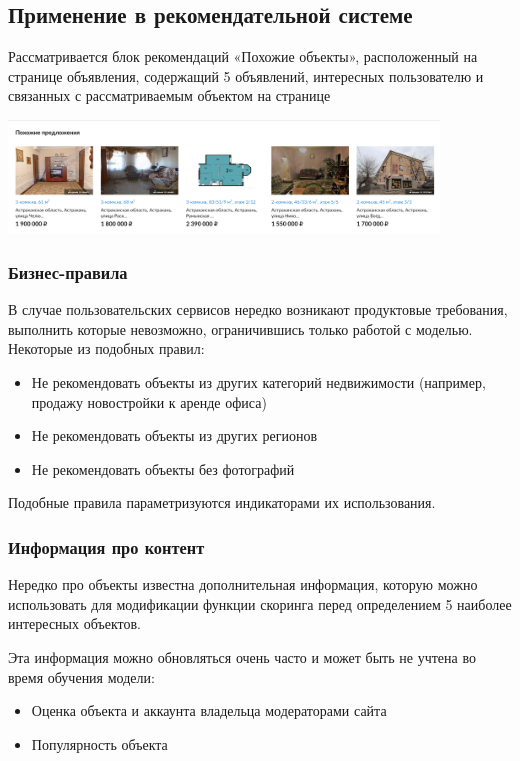 \documentclass{article}
\begin{document}
\subsection{Применение в рекомендательной системе}
Рассматривается блок рекомендаций «Похожие объекты», расположенный на странице объявления, содержащий 5 объявлений, интересных пользователю и связанных с рассматриваемым объектом на странице 
\par 

\vspace{3mm}

\includegraphics[height=3cm]{img0.png}
\par
\vspace{3mm}

\subsubsection{Бизнес-правила}

В случае пользовательских сервисов нередко возникают продуктовые требования, выполнить которые невозможно, ограничившись только работой с моделью. Некоторые из подобных правил:
\begin{itemize}  
\item Не рекомендовать объекты из других категорий недвижимости (например, продажу новостройки к аренде офиса)
\item Не рекомендовать объекты из других регионов
\item Не рекомендовать объекты без фотографий
\end{itemize}

Подобные правила параметризуются индикаторами их использования. 

\subsubsection{Информация про контент}
Нередко про объекты известна дополнительная информация, которую можно использовать для модификации функции скоринга перед определением 5 наиболее интересных объектов. 
\par
Эта информация можно обновляться очень часто и может быть не учтена во время обучения модели:
\begin{itemize}  
\item Оценка объекта и аккаунта владельца модераторами сайта
\item Популярность объекта
\end{itemize}
\end{document}
